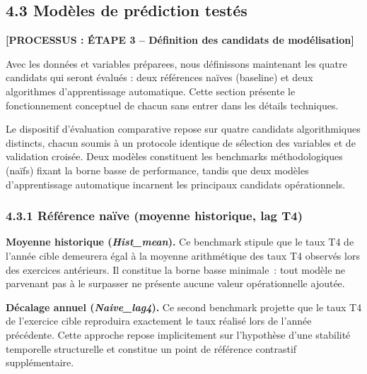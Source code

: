 \subsection*{4.3 \quad Mod\`eles de pr\'ediction test\'es}

\textbf{[PROCESSUS : \'ETAPE 3 -- D\'efinition des candidats de mod\'elisation]}

\noindent Avec les donn\'ees et variables pr\'eparees, nous d\'efinissons maintenant
les quatre candidats qui seront \'evalu\'es : deux r\'ef\'erences na\"ives (baseline)
et deux algorithmes d'apprentissage automatique. Cette section pr\'esente le
fonctionnement conceptuel de chacun sans entrer dans les d\'etails techniques.

Le dispositif d'\'evaluation comparative repose sur quatre candidats algorithmiques
distincts, chacun soumis \`a un protocole identique de s\'election des variables et de
validation crois\'ee. Deux mod\`eles constituent les benchmarks m\'ethodologiques (na\"ifs)
fixant la borne basse de performance, tandis que deux mod\`eles d'apprentissage automatique
incarnent les principaux candidats op\'erationnels.

\subsubsection*{4.3.1 \quad R\'ef\'erence na\"ive (moyenne historique, lag T4)}

\textbf{Moyenne historique (\textit{Hist\_mean}).} Ce benchmark stipule que le taux T4
de l'ann\'ee cible demeurera \'egal \`a la moyenne arithm\'etique des taux T4 observ\'es
lors des exercices ant\'erieurs. Il constitue la borne basse minimale~: tout mod\`ele
ne parvenant pas \`a le surpasser ne pr\'esente aucune valeur op\'erationnelle ajout\'ee.

\textbf{D\'ecalage annuel (\textit{Naive\_lag4}).} Ce second benchmark projette que le taux
T4 de l'exercice cible reproduira exactement le taux r\'ealis\'e lors de l'ann\'ee
pr\'ec\'edente. Cette approche repose implicitement sur l'hypoth\`ese d'une stabilit\'e
temporelle structurelle et constitue un point de r\'ef\'erence contrastif suppl\'ementaire.

